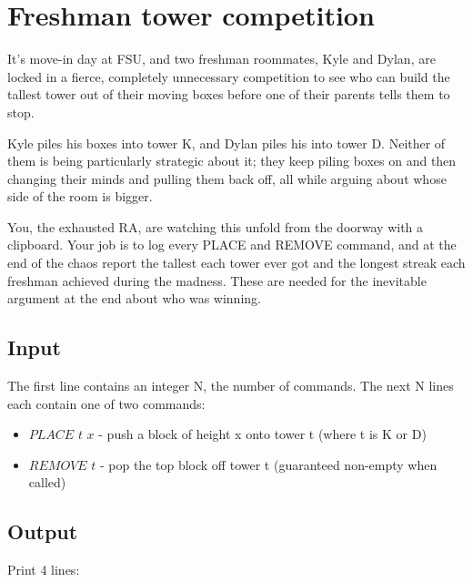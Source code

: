 \documentclass{article}
\let\oldsection\section
\renewcommand\section{\clearpage\oldsection}
\begin{document}


\section{Freshman tower competition}

It's move-in day at FSU, and two freshman roommates, Kyle and Dylan, are locked in a fierce, 
completely unnecessary competition to see who can build the tallest tower out of their moving 
boxes before one of their parents tells them to stop. \newline \newline

Kyle piles his boxes into tower K, and Dylan piles his into tower D. Neither of them is being 
particularly strategic about it; they keep piling boxes on and then changing their minds and 
pulling them back off, all while arguing about whose side of the room is bigger. \newline \newline

You, the exhausted RA, are watching this unfold from the doorway with a clipboard. Your job is 
to log every PLACE and REMOVE command, and at the end of the chaos report the tallest each tower 
ever got and the longest streak each freshman achieved during the madness. These are needed for 
the inevitable argument at the end about who was winning.   \newline

\subsection{Input}

The first line contains an integer N, the number of commands.
The next N lines each contain one of two commands:
\begin{itemize}
    \item $PLACE$ $t$ $x$ - push a block of height x onto tower t (where t is K or D)
    \item $REMOVE$ $t$ - pop the top block off tower t (guaranteed non-empty when called)
\end{itemize}

\subsection{Output}

Print 4 lines:
\end{document}
